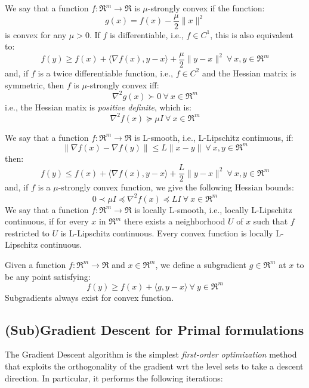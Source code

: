 \begin{definition} \label{def:strong_convexity}
We say that a function $f: \Re^m \rightarrow \Re$ is $\mu$-strongly convex if the function:
$$
g(x) = f(x) - \frac{\mu}{2} \| x \|^2
$$
is convex for any $\mu > 0$. 
If $f$ is differentiable, i.e., $f \in C^1$, this is also equivalent to:
$$
f(y) \geq f(x) + \langle \nabla f(x), y - x \rangle + \frac{\mu}{2} \| y - x \|^2 \ \forall \ x, y \in \Re^m
$$
and, if $f$ is a twice differentiable function, i.e., $f \in C^2$ and the Hessian matrix is symmetric, then $f$ is $\mu$-strongly convex iff:
$$
\nabla^2 g(x) \succ 0 \ \forall \ x \in \Re^m
$$
i.e., the Hessian matix is \emph{positive definite}, which is:
$$
\nabla^2 f(x) \succeq \mu I \ \forall \ x \in \Re^m
$$
\end{definition}

\begin{definition} \label{def:l_smoothness}
We say that a function $f: \Re^m \rightarrow \Re$ is L-smooth, i.e., L-Lipschitz continuous, if:
$$
\| \nabla f(x) - \nabla f(y) \| \leq L \| x - y \| \ \forall \ x, y \in \Re^m
$$
then:
$$
f(y) \leq f(x) + \langle \nabla f(x), y - x \rangle + \frac{L}{2} \| y - x \|^2 \ \forall \ x, y \in \Re^m
$$
and, if $f$ is a $\mu$-strongly convex function, we give the following Hessian bounds:
$$
0 \prec \mu I \preceq \nabla^2 f(x) \preceq L I \ \forall \ x \in \Re^m
$$
We say that a function $f: \Re^m \rightarrow \Re$ is locally L-smooth, i.e., locally L-Lipschitz continuous, if for every $x$ in $\Re^m$ there exists a neighborhood $U$ of $x$ such that $f$ restricted to $U$ is L-Lipschitz continuous. Every convex function is locally L-Lipschitz continuous.
\end{definition}

\begin{definition}[Subgradient] \label{def:subgradient}
Given a function $f: \Re^m \rightarrow \Re$ and $x \in \Re^m$, we define a subgradient $g \in \Re^m$ at $x$ to be any point satisfying:
$$
	f(y) \geq f(x) + \langle g, y - x \rangle \ \forall \ y \in \Re^m
$$
Subgradients always exist for convex function.
\end{definition}

\pagebreak

\subsection{(Sub)Gradient Descent for Primal formulations}

The Gradient Descent algorithm is the simplest \emph{first-order optimization} method that exploits the orthogonality of the gradient wrt the level sets to take a descent direction. In particular, it performs the following iterations:

